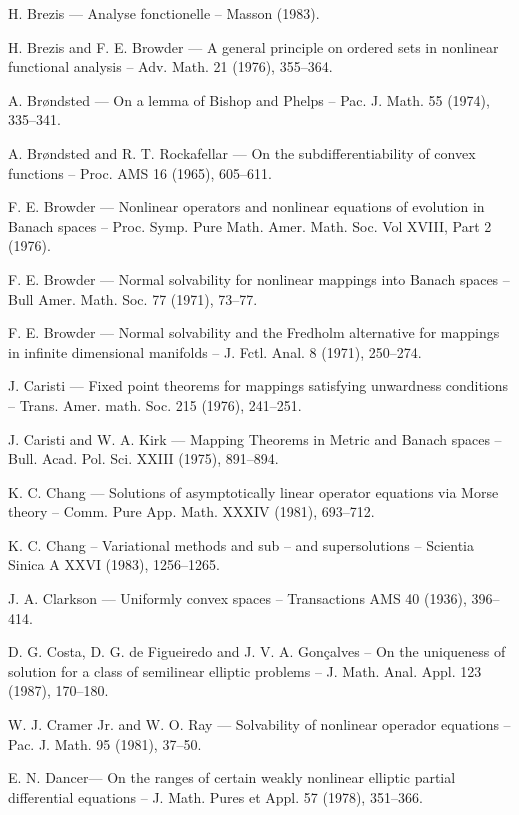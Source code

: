 \begin{thebibliography}{}
 H. Brezis --- Analyse fonctionelle -- Masson (1983).

 H. Brezis and F. E. Browder --- A general principle on
  ordered sets in nonlinear functional analysis -- Adv. Math. 21
  (1976), 355--364.

 A. Br{\o}ndsted --- On a lemma of Bishop and Phelps --
  Pac. J. Math. 55 (1974), 335--341.

 A. Br{\o}ndsted and R. T. Rockafellar --- On the
  subdifferentiability of convex functions -- Proc. AMS 16 (1965), 605--611.

 F. E. Browder --- Nonlinear operators and nonlinear
  equations of evolution in Banach spaces -- Proc. Symp. Pure
  Math. Amer. Math. Soc. Vol XVIII, Part 2 (1976).

 F. E. Browder --- Normal solvability for nonlinear
  mappings into Banach spaces -- Bull Amer. Math. Soc. 77 (1971), 73--77.

 F. E. Browder --- Normal solvability and the Fredholm
  alternative for mappings in infinite dimensional manifolds --
  J. Fctl. Anal. 8 (1971), 250--274.

 J. Caristi --- Fixed point theorems for mappings
  satisfying unwardness conditions -- Trans. Amer. math. Soc. 215
  (1976), 241--251.

 J. Caristi and W. A. Kirk --- Mapping Theorems in
  Metric and Banach spaces -- Bull. Acad. Pol. Sci. XXIII (1975),
  891--894. 

 K. C. Chang --- Solutions of asymptotically linear
  operator equations via Morse theory -- Comm. Pure App. Math. XXXIV
  (1981), 693--712.

 K. C. Chang -- Variational methods and sub -- and
  supersolutions -- Scientia Sinica A XXVI (1983), 1256--1265.

 J. A. Clarkson --- Uniformly convex spaces --
  Transactions AMS 40 (1936), 396--414.

 D. G. Costa, D. G. de Figueiredo and
  J. V. A. Gon\c{c}alves -- On the uniqueness of solution for a class
  of semilinear elliptic problems -- J. Math. Anal. Appl. 123 (1987),
  170--180. 

 W. J. Cramer Jr. and W. O. Ray --- Solvability of
  nonlinear operador equations -- Pac. J. Math. 95 (1981), 37--50. 

 E. N. Dancer\pageoriginale --- On the ranges of
  certain weakly nonlinear elliptic partial differential equations --
  J. Math. Pures et Appl. 57 (1978), 351--366.


\end{thebibliography}
